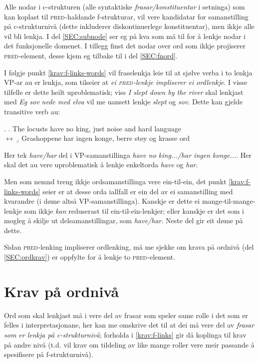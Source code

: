 \documentclass[12pt,a4paper,oneside,draft]{report}
\newcommand{\F}[2]{\textsc{#1}\ensuremath{_{#2}}}
\newcommand{\PRED}{\F{pred}{}}
\begin{document}
Alle nodar i c\hyp{}strukturen (alle syntaktiske \emph{frasar/konstituentar} i
setninga) som kan koplast til \PRED{}-haldande f\hyp{}strukturar, vil vere
kandidatar for samanstilling på c\hyp{}strukturnivå (dette inkluderer
diskontinuerlege konstituentar), men ikkje alle vil bli lenkja.  I del
\ref{SEC:subnode} ser eg på kva som må til for å lenkje nodar i det
funksjonelle domenet.  I tillegg finst det nodar over ord som ikkje
projiserer \PRED{}-element, desse kjem eg tilbake til i del
\ref{SEC:fnord}.

I følgje punkt \ref{krav:f-links-words} vil fraselenkja leie til at sjølve
verba i to lenkja VP-ar au er lenkja, som tilseier at \emph{ei \PRED{}-lenkje
impliserer ei ordlenkje}. I visse tilfelle er dette heilt
uproblematisk; viss \emph{I slept down by the river} skal lenkjast med
\emph{Eg sov nede med elva} vil me uansett lenkje \emph{slept} og \emph{sov}. Dette
kan gjelde transitive verb au:

\ex. \a. The locusts have no king, just noise and hard language\\
     $\leftrightarrow$
     \b. Grashoppene har ingen konge, berre støy og krasse ord


Her tek \emph{have/har} del i VP-samanstillinga \emph{have no king.../har
 ingen konge...}. Her skal det au vere uproblematisk å lenkje
 enkeltorda \emph{have} og \emph{har}.

Men som nemnd treng ikkje ordsamanstillinga vere ein-til-ein, det
 punkt \ref{krav:f-links-words} seier er at desse orda iallfall er ein
 del av ei samanstilling med kvarandre (i døme \Last altså
 VP-samanstillinga). Kanskje er dette ei mange-til-mange-lenkje som
 ikkje \emph{kan} reduserast til ein-til-ein-lenkjer; eller kanskje er
 det som i \Last mogleg å skilje ut delsamanstillingar, som
 \emph{have/har}. Neste del gir eit døme på dette.

Sidan \PRED{}-lenking impliserer ordlenking, må me sjekke om krava
 på ordnivå (del \ref{SEC:ordkrav}) er oppfylte for å lenkje to
 \PRED{}-element.

\section{Krav på ordnivå}
\label{sec-3.5}

\label{SEC:ordkrav}

Ord som skal lenkjast må i \cite{thunes2003eal} vere del av frasar som
speler same rolle i det som er felles i interpretasjonane, her kan me
omskrive det til at dei må vere del av \emph{frasar som er lenkja på c\hyp{}strukturnivå}; forholda i \ref{krav:f-links} gir då koplinga til krav på
andre nivå (t.d. vil krav om tildeling av like mange roller vere
meir passande å spesifisere på f\hyp{}strukturnivå).
\end{document}
